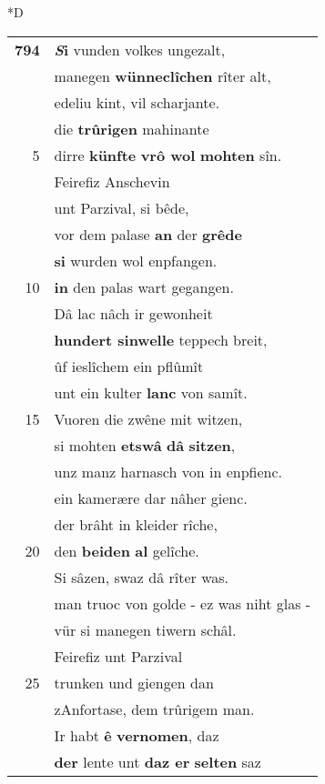 \documentclass[8pt,a4paper,notitlepage]{article}
\begin{document}
\begin{table}[ht]
\begin{minipage}[t]{0.5\linewidth}
\small
\begin{center}*D
\end{center}
\begin{tabular}{rl}
\textbf{794} & \textbf{\textit{S}i} vunden volkes ungezalt,\\ 
 & manegen \textbf{wünneclîchen} rîter alt,\\ 
 & edeliu kint, vil scharjante.\\ 
 & die \textbf{trûrigen} mahinante\\ 
5 & dirre \textbf{künfte} \textbf{vrô wol} \textbf{mohten} sîn.\\ 
 & Feirefiz Anschevin\\ 
 & unt Parzival, si bêde,\\ 
 & vor dem palase \textbf{an} der \textbf{grêde}\\ 
 & \textbf{si} wurden wol enpfangen.\\ 
10 & \textbf{in} den palas wart gegangen.\\ 
 & Dâ lac nâch ir gewonheit\\ 
 & \textbf{hundert sinwelle} teppech breit,\\ 
 & ûf ieslîchem ein pflûmît\\ 
 & unt ein kulter \textbf{lanc} von samît.\\ 
15 & Vuoren die zwêne mit witzen,\\ 
 & si mohten \textbf{etswâ} \textbf{dâ} \textbf{sitzen},\\ 
 & unz manz harnasch von in enpfienc.\\ 
 & ein kamerære dar nâher gienc.\\ 
 & der brâht in kleider rîche,\\ 
20 & den \textbf{beiden} \textbf{al} gelîche.\\ 
 & Si sâzen, swaz dâ rîter was.\\ 
 & man truoc von golde - ez was niht glas -\\ 
 & vür si manegen tiwern schâl.\\ 
 & Feirefiz unt Parzival\\ 
25 & trunken und giengen dan\\ 
 & zAnfortase, dem trûrigem man.\\ 
 & Ir habt \textbf{ê} \textbf{vernomen}, daz\\ 
 & \textbf{der} lente unt \textbf{daz er} \textbf{selten} saz\\ 

\end{tabular}
\end{minipage}
\end{table}
\end{document}
